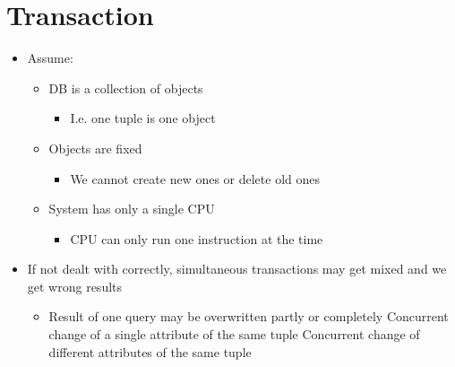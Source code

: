 
\section{Transaction}
\begin{itemize}
        \begin{itemize}
            \item Assume:
                \begin{itemize}
                    \item DB is a collection of objects
                        \begin{itemize}
                            \item I.e. one tuple is one object
                        \end{itemize}
                    \item Objects are fixed
                        \begin{itemize}
                            \item We cannot create new ones or delete old ones
                        \end{itemize}
                    \item System has only a single CPU
                        \begin{itemize}
                            \item CPU can only run one instruction at the time
                        \end{itemize}
                \end{itemize}
            \item If not dealt with correctly, simultaneous transactions may get mixed and we get wrong results
                \begin{itemize}
                     One way of mixing instructions
                        \begin{itemize}
                            \item Different schedules may result in different results
                        \end{itemize}
                    \item Result of one query may be overwritten partly or completely
                     Concurrent change of a single attribute of the same tuple
                     Concurrent change of different attributes of the same tuple

\end{itemize}
\end{itemize}
\end{itemize}
